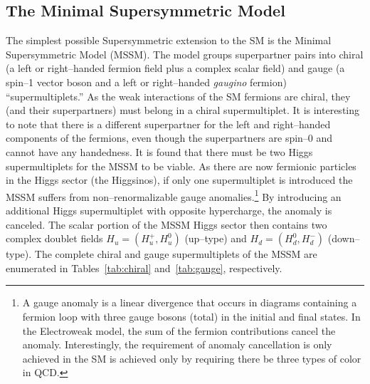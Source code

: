 \subsection{The Minimal Supersymmetric Model}
\label{sec:MSSMAndTaus} The simplest possible Supersymmetric extension to the
SM is the Minimal Supersymmetric Model (MSSM).  The model groups
superpartner pairs into chiral (a left or right--handed fermion field plus a
complex scalar field) and gauge (a spin--1 vector boson and a left or
right--handed \emph{gaugino} fermion) ``supermultiplets.''  As the weak
interactions of the SM fermions are chiral, they (and their
superpartners) must belong in a chiral supermultiplet.  It is interesting to
note that there is a different superpartner for the left and right--handed
components of the fermions, even though the superpartners are spin--0 and cannot
have any handedness. It is found that there must be two Higgs supermultiplets
for the MSSM to be viable.  As there are now fermionic particles in the Higgs
sector (the Higgsinos), if only one supermultiplet is introduced the MSSM suffers
from non--renormalizable gauge anomalies.\footnote{A gauge anomaly is a linear
divergence that occurs in diagrams containing a fermion loop with three gauge
bosons (total) in the initial and final states.  In the Electroweak model, the
sum of the fermion contributions cancel the anomaly.  Interestingly, the
requirement of anomaly cancellation is only achieved in the SM is achieved only
by requiring there be three types of color in QCD.}  By introducing an
additional Higgs supermultiplet with opposite hypercharge, the anomaly is
canceled. The scalar portion of the MSSM Higgs sector then contains two complex
doublet fields $H_u = (H^+_u, H^0_u)$ (up--type) and $H_d = (H^0_d, H^-_d)$
(down--type).  The complete chiral and gauge supermultiplets of the MSSM are
enumerated in Tables~\ref{tab:chiral} and~\ref{tab:gauge}, respectively.
\renewcommand{\arraystretch}{1.4}
